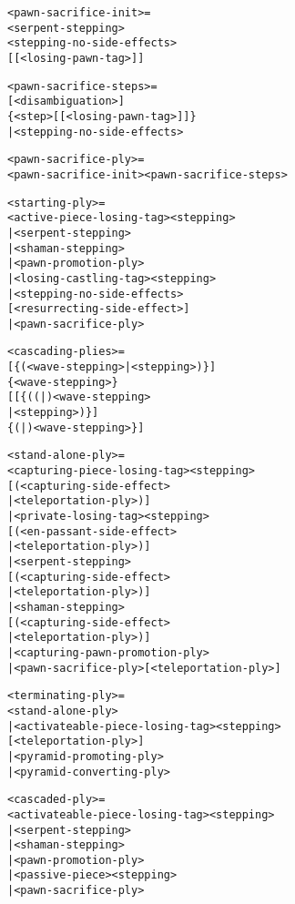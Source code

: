 \begin{alltt}
<pawn-sacrifice-init> =
  <serpent-stepping>
  <stepping-no-side-effects>
    [\alg{*}[<losing-pawn-tag>]]\alg{;;}

<pawn-sacrifice-steps> =
  [<disambiguation>]
    \{<step>[\alg{*}[<losing-pawn-tag>]]\}
| <stepping-no-side-effects>

<pawn-sacrifice-ply> =
  <pawn-sacrifice-init><pawn-sacrifice-steps>

<starting-ply> =
  <active-piece-losing-tag><stepping>
| <serpent-stepping>
| <shaman-stepping>
| <pawn-promotion-ply>
| <losing-castling-tag><stepping>
| <stepping-no-side-effects>
    [<resurrecting-side-effect>]
| <pawn-sacrifice-ply>

<cascading-plies> =
  [\{(<wave-stepping> | <stepping>)\}]
  \{<wave-stepping>\}
  [ [\{((\alg{~}|\alg{|})<wave-stepping>
       | <stepping>)\}]
    \{(\alg{~}|\alg{|})<wave-stepping>\} ]
\end{alltt}

\clearpage %

\begin{alltt}
<stand-alone-ply> =
  <capturing-piece-losing-tag><stepping>
  [(<capturing-side-effect>
    | <teleportation-ply>)]
| <private-losing-tag><stepping>
  [(<en-passant-side-effect>
    | <teleportation-ply>)]
| <serpent-stepping>
  [(<capturing-side-effect>
    | <teleportation-ply>)]
| <shaman-stepping>
  [(<capturing-side-effect>
    | <teleportation-ply>)]
| <capturing-pawn-promotion-ply>
| <pawn-sacrifice-ply>[<teleportation-ply>]

<terminating-ply> =
  <stand-alone-ply>
| <activateable-piece-losing-tag><stepping>
  [<teleportation-ply>]
| <pyramid-promoting-ply>
| <pyramid-converting-ply>

<cascaded-ply> =
  <activateable-piece-losing-tag><stepping>
| <serpent-stepping>
| <shaman-stepping>
| <pawn-promotion-ply>
| <passive-piece><stepping>
| <pawn-sacrifice-ply>
\end{alltt}

\clearpage %

